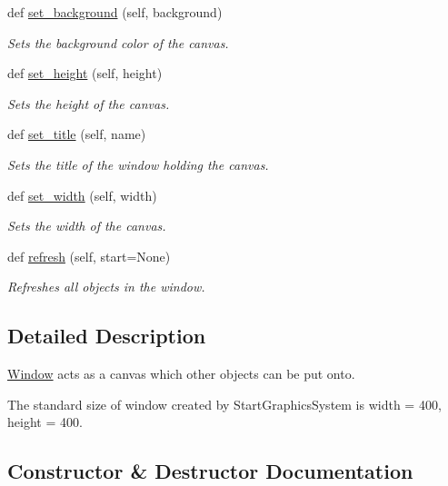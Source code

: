 \begin{DoxyCompactItemize}
def \mbox{\hyperlink{classcs110graphics__v2_1_1Window_a9d2ea5c7a8da999677a093016d012733}{set\+\_\+background}} (self, background)
\begin{DoxyCompactList}\small\item\em Sets the background color of the canvas. \end{DoxyCompactList}\item 
def \mbox{\hyperlink{classcs110graphics__v2_1_1Window_aff1c2aa712e6ed9c444ebce3c8501c5a}{set\+\_\+height}} (self, height)
\begin{DoxyCompactList}\small\item\em Sets the height of the canvas. \end{DoxyCompactList}\item 
def \mbox{\hyperlink{classcs110graphics__v2_1_1Window_a51c356f41a601bb5262901464ee8e564}{set\+\_\+title}} (self, name)
\begin{DoxyCompactList}\small\item\em Sets the title of the window holding the canvas. \end{DoxyCompactList}\item 
def \mbox{\hyperlink{classcs110graphics__v2_1_1Window_a4cc380067fac12547e4e954e4f2a7aa7}{set\+\_\+width}} (self, width)
\begin{DoxyCompactList}\small\item\em Sets the width of the canvas. \end{DoxyCompactList}\item 
def \mbox{\hyperlink{classcs110graphics__v2_1_1Window_a15dd1072a18c76df818f061b28009120}{refresh}} (self, start=None)
\begin{DoxyCompactList}\small\item\em Refreshes all objects in the window. \end{DoxyCompactList}\end{DoxyCompactItemize}


\subsection{Detailed Description}
\mbox{\hyperlink{classcs110graphics__v2_1_1Window}{Window}} acts as a canvas which other objects can be put onto. 

The standard size of window created by Start\+Graphics\+System is width = 400, height = 400. 

\subsection{Constructor \& Destructor Documentation}
\mbox{\label{classcs110graphics__v2_1_1Window_a93fbb743ae7c0e4461ed019915e57172}} 
